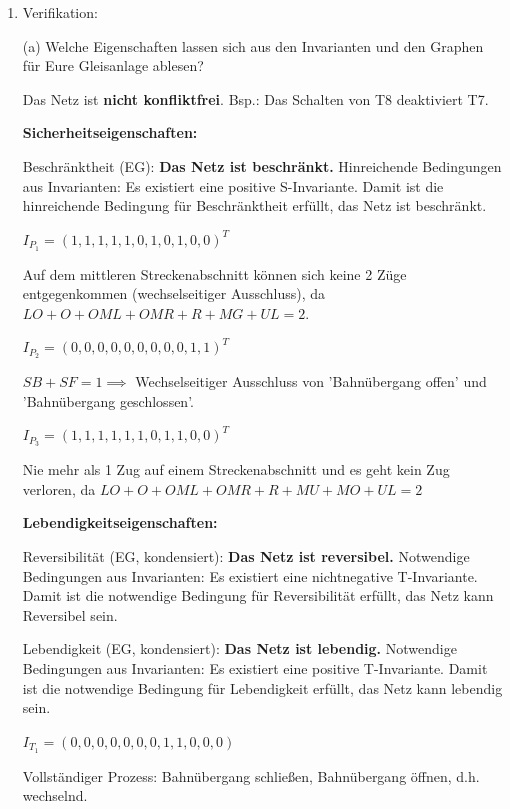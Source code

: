 \documentclass{scrreprt}
\begin{document}
\begin{enumerate}
\newpage

\item Verifikation:

(a) Welche Eigenschaften lassen sich aus den Invarianten und den Graphen für Eure Gleisanlage ablesen?

Das Netz ist \textbf{nicht konfliktfrei}.
Bsp.: Das Schalten von T8 deaktiviert T7. 

\textbf{Sicherheitseigenschaften:}


Beschränktheit (EG):
\textbf{Das Netz ist beschränkt.}
Hinreichende Bedingungen aus Invarianten:
  Es existiert eine positive S-Invariante.
  Damit ist die hinreichende Bedingung für Beschränktheit erfüllt,
  das Netz ist beschränkt.

$I_{P_1} = (1, 1, 1, 1, 1, 0, 1, 0, 1, 0, 0)^T$

Auf dem mittleren Streckenabschnitt können sich keine 2 Züge entgegenkommen (wechselseitiger Ausschluss), da $LO + O + OML + OMR + R + MG + UL = 2$. 

$I_{P_2} = (0, 0, 0, 0, 0, 0, 0, 0, 0, 1, 1)^T$

$SB + SF = 1 \implies$ Wechselseitiger Ausschluss von 'Bahnübergang offen' und 'Bahnübergang geschlossen'.

$I_{P_3} = (1, 1, 1, 1, 1, 1, 0, 1, 1, 0, 0)^T$

Nie mehr als 1 Zug auf einem Streckenabschnitt und es geht kein Zug verloren, da $LO + O + OML + OMR + R + MU + MO + UL = 2$

\textbf{Lebendigkeitseigenschaften:}

Reversibilität (EG, kondensiert):
\textbf{Das Netz ist reversibel.}
Notwendige Bedingungen aus Invarianten:
  Es existiert eine nichtnegative T-Invariante.
  Damit ist die notwendige Bedingung für Reversibilität erfüllt,
  das Netz kann Reversibel sein.

Lebendigkeit (EG, kondensiert):
\textbf{Das Netz ist lebendig.}
Notwendige Bedingungen aus Invarianten:
  Es existiert eine positive T-Invariante.
  Damit ist die notwendige Bedingung für Lebendigkeit erfüllt,
  das Netz kann lebendig sein.


$I_{T_1} = (0, 0, 0, 0, 0, 0, 0, 1, 1, 0, 0, 0)$

Vollständiger Prozess: Bahnübergang schließen, Bahnübergang öffnen, d.h. wechselnd.


\end{enumerate}
\end{document}
